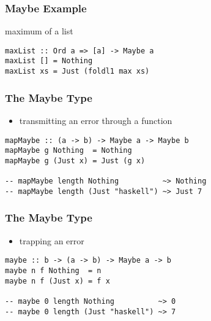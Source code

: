 \documentclass[dvipsnames]{beamer}
\theoremstyle{plain}
\begin{document}
\begin{frame}[fragile]
  \frametitle{Maybe Example}

  \begin{exampleblock}{maximum of a list}
    \begin{lstlisting}
maxList :: Ord a => [a] -> Maybe a
maxList [] = Nothing
maxList xs = Just (foldl1 max xs)
    \end{lstlisting}
  \end{exampleblock}
\end{frame}

\begin{frame}[fragile]
  \frametitle{The Maybe Type}

  \begin{itemize}
    \item transmitting an error through a function
  \end{itemize}

  \begin{exampleblock}{}
    \begin{lstlisting}
mapMaybe :: (a -> b) -> Maybe a -> Maybe b
mapMaybe g Nothing  = Nothing
mapMaybe g (Just x) = Just (g x)

-- mapMaybe length Nothing          ~> Nothing
-- mapMaybe length (Just "haskell") ~> Just 7
    \end{lstlisting}
  \end{exampleblock}
\end{frame}

\begin{frame}[fragile]
  \frametitle{The Maybe Type}

  \begin{itemize}
    \item trapping an error
  \end{itemize}

  \begin{exampleblock}{}
    \begin{lstlisting}
maybe :: b -> (a -> b) -> Maybe a -> b
maybe n f Nothing  = n
maybe n f (Just x) = f x

-- maybe 0 length Nothing          ~> 0
-- maybe 0 length (Just "haskell") ~> 7
    \end{lstlisting}
  \end{exampleblock}
\end{frame}
\end{document}
